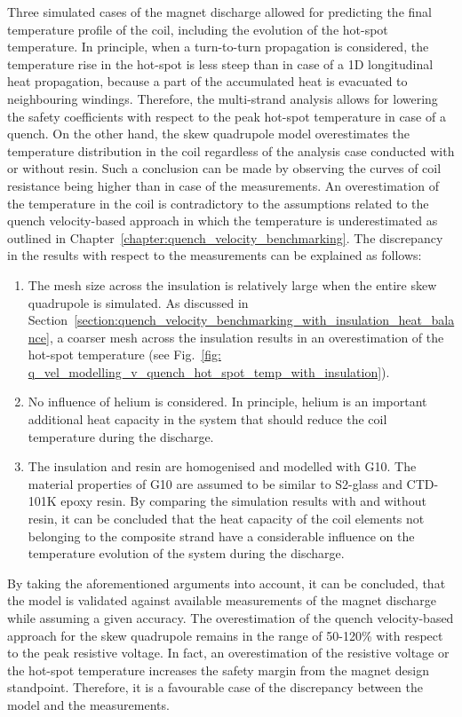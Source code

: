 
Three simulated cases of the magnet discharge allowed for predicting the final temperature profile of the coil, including the evolution of the hot-spot temperature. In principle, when a turn-to-turn propagation is considered, the temperature rise in the hot-spot is less steep than in case of a 1D longitudinal heat propagation, because a part of the accumulated heat is evacuated to neighbouring windings. Therefore, the multi-strand analysis allows for lowering the safety coefficients with respect to the peak hot-spot temperature in case of a quench. On the other hand, the skew quadrupole model overestimates the temperature distribution in the coil regardless of the analysis case conducted with or without resin. Such a conclusion can be made by observing the curves of coil resistance being higher than in case of the measurements. An overestimation of the temperature in the coil is contradictory to the assumptions related to the quench velocity-based approach in which the temperature is underestimated as outlined in Chapter~\ref{chapter:quench_velocity_benchmarking}. The discrepancy in the results with respect to the measurements can be explained as follows: 

\begin{enumerate}
    \item The mesh size across the insulation is relatively large when the entire skew quadrupole is simulated. As discussed in Section~\ref{section:quench_velocity_benchmarking_with_insulation_heat_balance}, a coarser mesh across the insulation results in an overestimation of the hot-spot temperature (see Fig.~\ref{fig: q_vel_modelling_v_quench_hot_spot_temp_with_insulation}).
    \item No influence of helium is considered. In principle, helium is an important additional heat capacity in the system that should reduce the coil temperature during the discharge.
    \item The insulation and resin are homogenised and modelled with G10. The material properties of G10 are assumed to be similar to S2-glass and CTD-101K epoxy resin. By comparing the simulation results with and without resin, it can be concluded that the heat capacity of the coil elements not belonging to the composite strand have a considerable influence on the temperature evolution of the system during the discharge.
\end{enumerate}

By taking the aforementioned arguments into account, it can be concluded, that the model is validated against available measurements of the magnet discharge while assuming a given accuracy. The overestimation of the quench velocity-based approach for the skew quadrupole remains in the range of 50-120\% with respect to the peak resistive voltage. In fact, an overestimation of the resistive voltage or the hot-spot temperature increases the safety margin from the magnet design standpoint. Therefore, it is a favourable case of the discrepancy between the model and the measurements. 